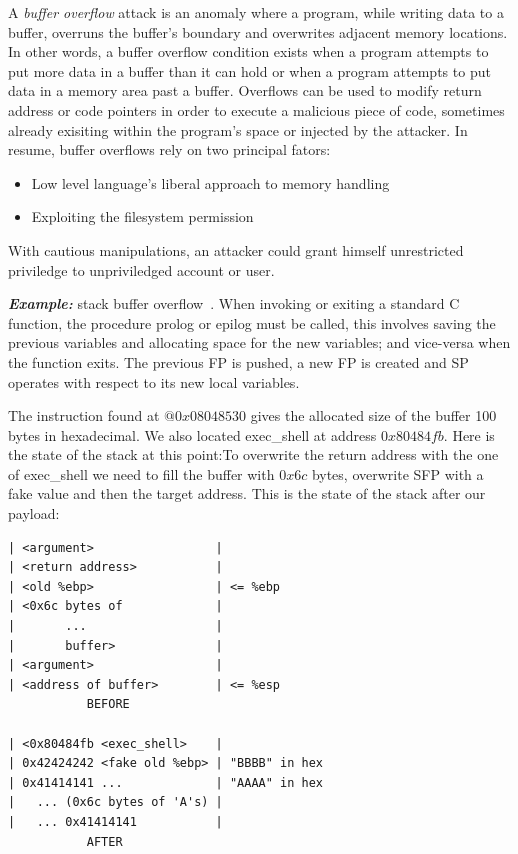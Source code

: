 \documentclass[10pt,twocolumn]{article}
\begin{document}


A \textit{buffer overflow} attack is an anomaly where a
program, while writing data to a buffer, overruns the buffer's boundary and
overwrites adjacent memory locations. In other words, a buffer overflow condition exists when a program attempts to put more data in a buffer than it can
hold or when a program attempts to put data in a memory area past a
buffer. Overflows can be used to modify return address or code pointers in order
to execute a malicious piece of code, sometimes already exisiting within the
program's space or injected by the attacker. In resume, buffer overflows rely
on two principal fators: 

\begin{itemize}
    \item Low level language's liberal approach to memory handling
    \item Exploiting the filesystem permission
\end{itemize}

With cautious manipulations, an attacker could grant himself unrestricted
priviledge to unpriviledged account or user.

\textbf{\textit{Example:}} stack buffer overflow~\cite{one_stacksmashing_1996}. When invoking or exiting a standard C function,
the procedure prolog or epilog must be called, this involves saving the
previous variables and allocating space for the new variables; and vice-versa
when the function exits. The previous FP is pushed, a new FP is created and SP
operates with respect to its new local variables.

The instruction found at $@0x08048530$ gives the allocated size of the buffer
100 bytes in hexadecimal. We also located exec\_shell at address $0x80484fb$. Here is the
state of the stack at this point:To overwrite the return address with the one
of exec\_shell we need to fill the buffer with $0x6c$ bytes, overwrite SFP with a
fake value and then the target address. This is the state of the stack after
our payload:

\begin{lstlisting}
| <argument>                 |
| <return address>           |
| <old %ebp>                 | <= %ebp
| <0x6c bytes of             |
|       ...                  |
|       buffer>              |
| <argument>                 |
| <address of buffer>        | <= %esp
           BEFORE

| <0x80484fb <exec_shell>    |
| 0x42424242 <fake old %ebp> | "BBBB" in hex
| 0x41414141 ...             | "AAAA" in hex
|   ... (0x6c bytes of 'A's) |
|   ... 0x41414141           |
           AFTER
\end{lstlisting}
\end{document}
